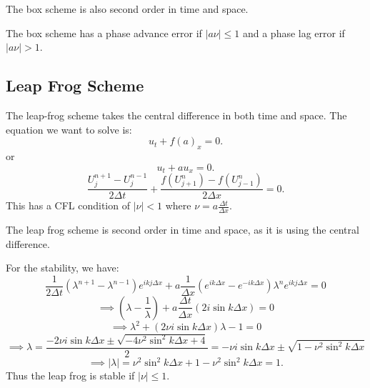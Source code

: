 \documentclass[../main/main.tex]{subfiles}
\begin{document}
\begin{remark}
    The box scheme is also second order in time and space.
\end{remark}
\begin{remark}
    The box scheme has a phase advance error if $|a\nu|\le 1$ and a phase lag error if $|a\nu| > 1$.
\end{remark}
\subsection{Leap Frog Scheme}
The leap-frog scheme takes the central difference in both time and space. The equation we want to solve is: \[
    u_t + f(a)_x = 0
.\] or \[
u_t + au_x = 0
.\] 
\[
    \frac{U_j^{n+1}-U_j^{n-1}}{2\Delta t} + \frac{f(U_{j+1}^{n})-f(U_{j-1}^{n})}{2\Delta x} = 0
.\] 
This has a CFL condition of $|\nu| < 1$ where  $\nu = a \frac{ \Delta t}{\Delta x}$.
\begin{remark}
    The leap frog scheme is second order in time and space, as it is using the central difference.
\end{remark}
For the stability, we have: \[
    \frac{1}{2\Delta t}(\lambda^{n+1}-\lambda^{n-1})e^{ikj\Delta x} + a \frac{1}{\Delta x}(e^{ik\Delta x}-e^{-ik\Delta x})\lambda^{n}e^{ikj\Delta x} = 0
\] \[
\implies \left( \lambda - \frac{1}{\lambda} \right)  + a \frac{\Delta t}{\Delta x}(2i\sin k \Delta x) = 0
\] \[
\implies \lambda^2 + (2\nu i \sin k \Delta x) \lambda - 1 = 0
\] \[
\implies \lambda = \frac{-2\nu i \sin k \Delta x \pm \sqrt{-4\nu^2\sin^2k\Delta x + 4} }{2} = -\nu i \sin k \Delta x  \pm \sqrt{1-\nu^2\sin^2 k\Delta x} \] \[
\implies |\lambda| = \nu^2 \sin^2k\Delta x + 1-\nu^2 \sin^2 k \Delta x = 1
.\] Thus the leap frog is stable if $|\nu| \le  1$.
\end{document}
